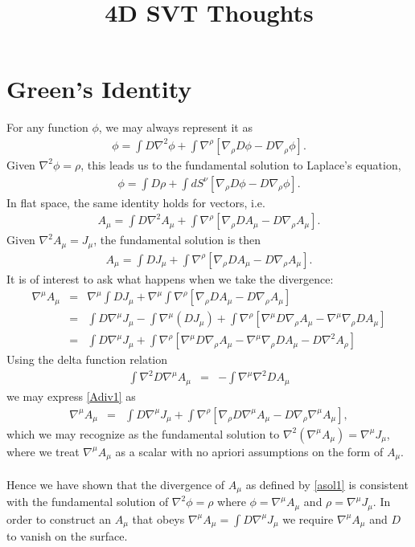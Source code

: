 \documentclass[10pt,letterpaper]{article}
\title{4D SVT Thoughts}
\date{}
\begin{document}
 
	\maketitle
	\noindent 
\section*{Green's Identity}
For any function $\phi$, we may always represent it as
\begin{eqnarray}
\phi = \int D \nabla^2 \phi + \int \nabla^\rho[\nabla_\rho D\phi - D\nabla_\rho \phi].
\end{eqnarray}
Given $\nabla^2\phi =\rho$, this leads us to the fundamental solution to Laplace's equation,
\begin{eqnarray}
\phi = \int D \rho + \int dS^\nu[\nabla_\rho D\phi - D\nabla_\rho \phi].
\end{eqnarray}
In flat space, the same identity holds for vectors, i.e.
\begin{eqnarray}
A_\mu = \int D \nabla^2 A_\mu + \int \nabla^\rho[\nabla_\rho DA_\mu - D\nabla_\rho A_\mu].
\end{eqnarray}
Given $\nabla^2 A_\mu = J_\mu$, the fundamental solution is then
\begin{eqnarray}
A_\mu = \int D J_\mu + \int \nabla^\rho[\nabla_\rho DA_\mu - D\nabla_\rho A_\mu].
\label{asol1}
\end{eqnarray}
It is of interest to ask what happens when we take the divergence:
\begin{eqnarray}
\nabla^\mu A_\mu &=& \nabla^\mu \int D J_\mu + \nabla^\mu \int \nabla^\rho[\nabla_\rho DA_\mu - D\nabla_\rho A_\mu]
\nonumber\\
&=& \int D \nabla^\mu J_\mu - \int \nabla^\mu (DJ_\mu) + \int \nabla^\rho[\nabla^\mu D\nabla_\rho A_\mu- \nabla^\mu \nabla_\rho DA_\mu ]
\nonumber\\
&=& \int D \nabla^\mu J_\mu + \int \nabla^\rho[\nabla^\mu D \nabla_\rho A_\mu - \nabla^\mu \nabla_\rho D A_\mu - D\nabla^2 A_\rho ]
\label{Adiv1}
\end{eqnarray}
Using the delta function relation
\begin{eqnarray}
\int \nabla^2 D \nabla^\mu A_\mu &=& - \int \nabla^\mu \nabla^2 D A_\mu
\end{eqnarray}
we may express \eqref{Adiv1} as 
\begin{eqnarray}
\nabla^\mu A_\mu &=& \int D \nabla^\mu J_\mu + \int \nabla^\rho[ \nabla_\rho D \nabla^\mu A_\mu - D\nabla_\rho \nabla^\mu A_\mu],
\label{adiv}
\end{eqnarray}
which we may recognize as the fundamental solution to $\nabla^2 (\nabla^\mu A_\mu) = \nabla^\mu J_\mu$, where we treat $\nabla^\mu A_\mu$ as a scalar with no apriori assumptions on the form of $A_\mu$. 
\\ \\
Hence we have shown that the divergence of $A_\mu$ as defined by \eqref{asol1} is consistent with the fundamental solution of $\nabla^2 \phi = \rho$ where $\phi = \nabla^\mu A_\mu$ and $\rho = \nabla^\mu J_\mu$. In order to construct an $A_\mu$ that obeys $\nabla^\mu A_\mu = \int D \nabla^\mu J_\mu$ we require $\nabla^\mu A_\mu$ and $D$ to vanish on the surface.
%
%
%
\end{document}
